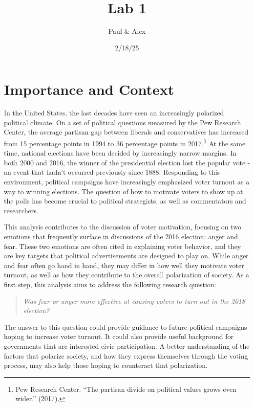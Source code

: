 \documentclass[
  letterpaper,
  DIV=11,
  numbers=noendperiod,
  onecolumn]{scrartcl}
\title{Lab 1}
\author{Paul \& Alex}
\date{2/18/25}
\begin{document}
\maketitle


\newpage

\section{Importance and Context}\label{importance-and-context}

In the United States, the last decades have seen an increasingly
polarized political climate. On a set of political questions measured by
the Pew Research Center, the average partisan gap between liberals and
conservatives has increased from 15 percentage points in 1994 to 36
percentage points in 2017.\footnote{Pew Research Center. ``The partisan
  divide on political values grows even wider.'' (2017).} At the same
time, national elections have been decided by increasingly narrow
margins. In both 2000 and 2016, the winner of the presidential election
lost the popular vote - an event that hadn't occurred previously since
1888. Responding to this environment, political campaigns have
increasingly emphasized voter turnout as a way to winning elections. The
question of how to motivate voters to show up at the polls has become
crucial to political strategists, as well as commentators and
researchers.

This analysis contributes to the discussion of voter motivation,
focusing on two emotions that frequently surface in discussions of the
2016 election: anger and fear. These two emotions are often cited in
explaining voter behavior, and they are key targets that political
advertisements are designed to play on. While anger and fear often go
hand in hand, they may differ in how well they motivate voter turnout,
as well as how they contribute to the overall polarization of society.
As a first step, this analysis aims to address the following research
question:

\begin{quote}
\emph{Was fear or anger more effective at causing voters to turn out in
the 2018 election?}
\end{quote}

The answer to this question could provide guidance to future political
campaigns hoping to increase voter turnout. It could also provide useful
background for governments that are interested civic participation. A
better understanding of the factors that polarize society, and how they
express themselves through the voting process, may also help those
hoping to counteract that polarization.
\end{document}
